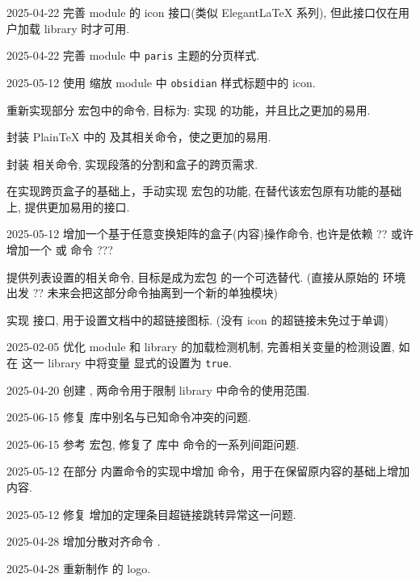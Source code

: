 \begin{todolist}
  \item [2025-04-22] 完善  module 的 icon 接口(类似 Elegant\LaTeX{} 系列), 但此接口仅在用户加载  library 时才可用.
  \item [2025-04-22] 完善  module 中 \texttt{paris} 主题的分页样式. 
  \item [2025-05-12] 使用  缩放  module 中 \texttt{obsidian} 样式标题中的 icon.
  \item 重新实现部分  宏包中的命令, 目标为: 实现  的功能，并且比之更加的易用.
  \item 封装 Plain\TeX{} 中的  及其相关命令，使之更加的易用.
  \item 封装 \cmd{\lastbox} 相关命令, 实现段落的分割和盒子的跨页需求.
  \item*[使用 \CusTeX{} 中的 \pkg{framedmulticol} 宏包] 在实现跨页盒子的基础上，手动实现  宏包的功能, 在替代该宏包原有功能的基础上, 提供更加易用的接口.
  \item [2025-05-12] 增加一个基于任意变换矩阵的盒子(内容)操作命令, 也许是依赖  ?? 或许增加一个  或  命令 ???
  \item 提供列表设置的相关命令, 目标是成为宏包  的一个可选替代. (直接从原始的  环境出发 ?? 未来会把这部分命令抽离到一个新的单独模块)
  \item 实现  接口, 用于设置文档中的超链接图标. (没有 icon 的超链接未免过于单调)
  \item [2025-02-05] 优化 module 和 library 的加载检测机制, 完善相关变量的检测设置, 如在  这一 library 中将变量  显式的设置为 \texttt{true}.
  \item [2025-04-20] 创建 ,  两命令用于限制  library 中命令的使用范围.
  \item [2025-06-15] 修复  库中别名与已知命令冲突的问题.
  \item [2025-06-15] 参考  宏包, 修复了  库中  命令的一系列间距问题.
  \item [2025-05-12] 在部分 \ztex{} 内置命令的实现中增加  命令，用于在保留原内容的基础上增加内容.
  \item [2025-05-12] 修复 \cmd{\zthmtocadd} 增加的定理条目超链接跳转异常这一问题.
  \item [2025-04-28] 增加分散对齐命令 \cmd{\zboxitemalign}.
  \item [2025-04-28] 重新制作 \ztex* 的 logo.

\end{todolist}
